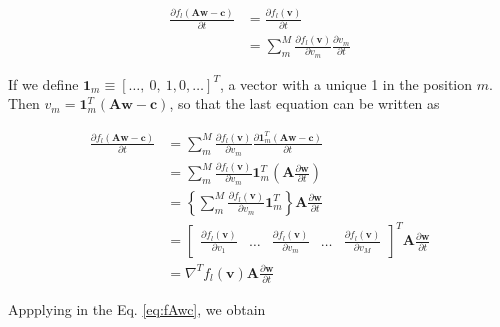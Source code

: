 \begin{align}
\frac{\partial f_{l}\left(\mathbf{A}\mathbf{w}-\mathbf{c}\right)}{\partial t}
&=
\frac{\partial f_{l}\left(\mathbf{v}\right)}{\partial t}\\[4pt]
&=
\sum_{m}^{M}
\frac{\partial f_{l}\left(\mathbf{v}\right)}{\partial v_m}
\frac{\partial v_m}{\partial t}
\end{align}

If we define $\boxed{\mathbf{1}}_{m}\equiv [\dots,~0,~1,0,\dots]^{T}$,
a vector with a unique 1 in the position $m$. 
Then $v_m = \boxed{\mathbf{1}}_{m}^{T}\left(\mathbf{A}\mathbf{w}-\mathbf{c}\right)$,
so that the last equation can be written as

\begin{align}
\frac{\partial f_{l}\left(\mathbf{A}\mathbf{w}-\mathbf{c}\right)}{\partial t}
&=
\sum_{m}^{M}
\frac{\partial f_{l}\left(\mathbf{v}\right)}{\partial v_m}
\frac{\partial \boxed{\mathbf{1}}_{m}^{T}\left(\mathbf{A}\mathbf{w}-\mathbf{c}\right)}{\partial t}\\[4pt]
&=
\sum_{m}^{M}
\frac{\partial f_{l}\left(\mathbf{v}\right)}{\partial v_m}
\boxed{\mathbf{1}}_{m}^{T}\left(\mathbf{A}\frac{\partial \mathbf{w}}{\partial t}\right)\\[4pt]
&=
\left\{
\sum_{m}^{M}
\frac{\partial f_{l}\left(\mathbf{v}\right)}{\partial v_m}
\boxed{\mathbf{1}}_{m}^{T}
\right\}
\mathbf{A}\frac{\partial \mathbf{w}}{\partial t}\\[4pt]
&=
\begin{bmatrix}
\frac{\partial f_{l}\left(\mathbf{v}\right)}{\partial v_1} &
\dots &
\frac{\partial f_{l}\left(\mathbf{v}\right)}{\partial v_m} &
\dots &
\frac{\partial f_{l}\left(\mathbf{v}\right)}{\partial v_M} 
\end{bmatrix}^{T}
\mathbf{A}\frac{\partial \mathbf{w}}{\partial t}\\[4pt]
&=
\nabla^{T} f_{l}\left(\mathbf{v}\right)
\mathbf{A}\frac{\partial \mathbf{w}}{\partial t}
\end{align}

Appplying in the Eq. \ref{eq:fAwc}, we obtain

